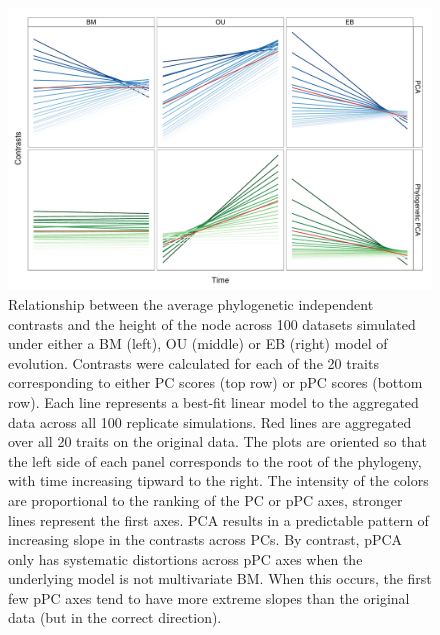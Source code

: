 \documentclass[a4paper,11pt]{article}
\begin{document}
\begin{figure}[p]
\centering
\includegraphics[scale=0.65]{./fig/nh-2panel.pdf}
\caption{Relationship between the average phylogenetic independent contrasts and the height of the node across 100 datasets simulated under either a BM (left), OU (middle) or EB (right) model of evolution. Contrasts were calculated for each of the 20 traits corresponding to either PC scores (top row) or pPC scores (bottom row). Each line represents a best-fit linear model to the aggregated data across all 100 replicate simulations. Red lines are aggregated over all 20 traits on the original data. The plots are oriented so that the left side of each panel corresponds to the root of the phylogeny, with time increasing tipward to the right. The intensity of the colors are proportional to the ranking of the PC or pPC axes, stronger lines represent the first axes. PCA results in a predictable pattern of increasing slope in the contrasts across PCs. By contrast, pPCA only has systematic distortions across pPC axes when the underlying model is not multivariate BM. When this occurs, the first few pPC axes tend to have more extreme slopes than the original data (but in the correct direction).}
\label{nhplot}
\end{figure}
\end{document}
